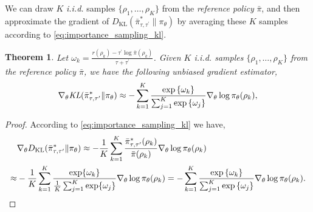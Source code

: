 \documentclass{article}
\DeclareMathOperator*\ep{\mathbb{E}}
\newcommand*{\refPi}{\bar{\pi}}
\newcommand{\KL}{D_{\text{KL}}}
\newtheorem{thm}{Theorem}
\begin{document}
We can draw $K$ \textit{i.i.d.} samples $\{\rho_1, \dots, \rho_K\}$ from the \emph{reference policy} $\refPi$, and then approximate the gradient of $\KL(\bar{\pi}_{\tau,\tau^{\prime}}^* \| \pi_\theta)$ by averaging these $K$ samples according to \cref{eq:importance_sampling_kl}. 

\begin{thm}
	\label{thm:repmdgradientestimate}
	Let $\omega_k = \frac{r(\rho_k) - \tau^{\prime} \log{\refPi(\rho_k)} }{\tau + \tau^{\prime}}
$. Given $K$ \emph{i.i.d.} samples $\{\rho_1, \dots, \rho_K\}$ from the \emph{reference policy} $\refPi$, we have the following unbiased gradient estimator,
	\begin{equation}
	\label{eq:gradient_estimator}
	\nabla_{\theta} \text{\em KL}(\bar{\pi}_{\tau,\tau^{\prime}}^* \| \pi_\theta)\approx -\sum\limits_{k=1}^K{ \frac{ \exp\left\{ \omega_k \right\} }{ \sum_{j=1}^K{ \exp\left\{ \omega_j \right\}}} \nabla_{\theta} \log{\pi_\theta(\rho_k)} },
	\end{equation}
\end{thm}
\begin{proof}
	According to \cref{eq:importance_sampling_kl} we have,
	\begin{equation}
	\begin{split}
	&\nabla_{\theta} \KL(\bar{\pi}_{\tau,\tau^{\prime}}^* \| \pi_\theta) \approx -\frac{1}{K}\sum_{k=1}^K \frac{\bar{\pi}_{\tau,\tau^{\prime}}^* (\rho_k)}{\refPi(\rho_k)} \nabla_{\theta} \log \pi_\theta(\rho_k) \\ 
	\approx & -\frac{1}{K}\sum_{k=1}^K \frac{\exp \{\omega_k\}} {\frac{1}{K} \sum_{j=1}^K \exp \{\omega_j\}} \nabla_{\theta} \log \pi_\theta(\rho_k) =  -\sum\limits_{k=1}^K{ \frac{ \exp\left\{ \omega_k \right\} }{ \sum_{j=1}^K{ \exp\left\{ \omega_j \right\}}} \nabla_{\theta} \log{\pi_\theta(\rho_k)} } \qedhere.
	\end{split}
	\end{equation}
\end{proof}

%

\end{document}
